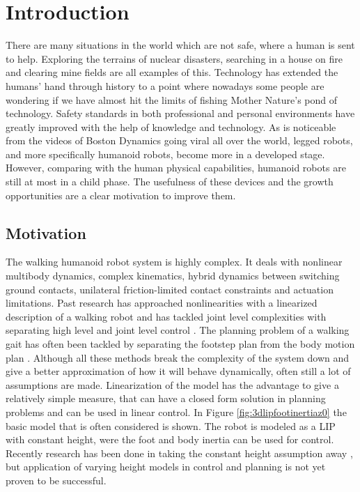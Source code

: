 %
\chapter{Introduction} \label{chap::intro}%
There are many situations in the world which are not safe, where a human is sent to help. Exploring the terrains of nuclear disasters, searching in a house on fire and clearing mine fields are all examples of this. Technology has extended the humans' hand through history to a point where nowadays some people are wondering if we have almost hit the limits of fishing Mother Nature's pond of technology.  Safety standards in both professional and personal environments have greatly improved with the help of knowledge and technology. As is noticeable from the videos of Boston Dynamics going viral all over the world, legged robots, and more specifically humanoid robots, become more in a developed stage. However, comparing with the human physical capabilities, humanoid robots are still at most in a child phase.  The usefulness of these devices and the growth opportunities are a clear motivation to improve them.
\section{Motivation}
The walking humanoid robot system is highly complex. It deals with nonlinear multibody dynamics, complex kinematics, hybrid dynamics between switching ground contacts, unilateral friction-limited contact constraints and actuation limitations. Past research has approached nonlinearities with a linearized description of a walking robot \cite{kajita1992dynamic, pratt2006capture, koolen2012capturability} and has tackled joint level complexities with separating high level and joint level control \cite{kuindersma2016optimization, koolen2016design}. The planning problem of a walking gait has often been tackled by separating the footstep plan from the body motion plan \cite{chestnutt2005footstep,deits2014footstep,englsberger2014trajectory}. Although all these methods break the complexity of the system down and give a better approximation of how it will behave dynamically, often still a lot of assumptions are made. Linearization of the model has the advantage to give a relatively simple measure, that can have a closed form solution in planning problems and can be used in linear control. In Figure \ref{fig:3dlipfootinertiaz0} the basic model that is often considered is shown. The robot is modeled as a \ac{LIP} with constant height, were the foot and body inertia can be used for control. Recently research has been done in taking the constant height assumption away \cite{hopkins2014humanoid, koolen2016balance, gao2017increase,nguyen2017dynamic, caron2018capturability}, but application of varying height models in control and planning is not yet proven to be successful. 
